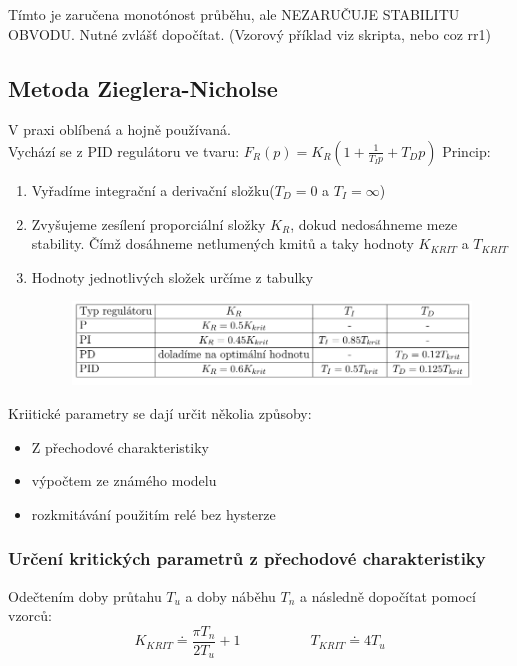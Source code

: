 Tímto je zaručena monotónost průběhu, ale NEZARUČUJE STABILITU OBVODU.  Nutné zvlášť dopočítat.
(Vzorový příklad viz skripta, nebo coz rr1)\\
\newpage

\subsection*{Metoda Zieglera-Nicholse}
V praxi oblíbená a hojně používaná.\\
Vychází se z PID regulátoru ve tvaru: $F_R(p) = K_R(1+\frac{1}{T_Ip}+T_Dp)$
Princip:
\begin{enumerate}
    \item Vyřadíme integrační a derivační složku($T_D = 0$ a $T_I = \infty$)
    \item Zvyšujeme zesílení proporciální složky $K_R$, dokud nedosáhneme meze stability. Čímž dosáhneme netlumených kmitů a taky hodnoty $K_{KRIT}$ a $T_{KRIT}$
    \item Hodnoty jednotlivých složek určíme z tabulky
          \begin{figure}[H]
              \includegraphics*[scale = 1]{images/ZHtab.png}
          \end{figure}
\end{enumerate}
Kriitické parametry se dají určit několia způsoby:
\begin{itemize}
    \item Z přechodové charakteristiky
    \item výpočtem ze známého modelu
    \item rozkmitávání použitím relé bez hysterze
\end{itemize}

\subsubsection*{Určení kritických parametrů z přechodové charakteristiky}
Odečtením doby průtahu $T_u$ a doby náběhu $T_n$ a následně dopočítat pomocí vzorců:
\begin{equation}
    K_{KRIT} \doteq \frac{\pi T_n}{2T_u}+1 \;\;\;\;\;\;\;\;\;\;\;\;\;\;\;\;\;\; T_{KRIT} \doteq 4T_u
\end{equation}

